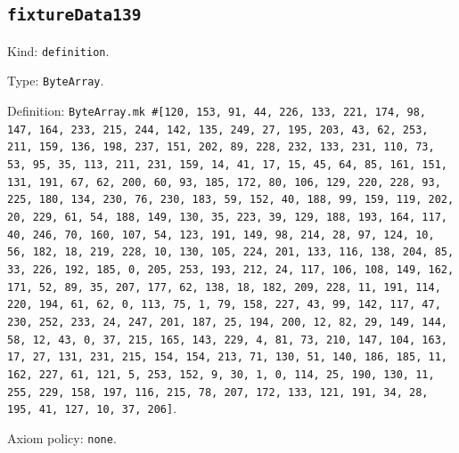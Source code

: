 \documentclass[11pt]{article}
\begin{document}
\subsection*{\texttt{fixtureData139}}
\noindent Kind: \texttt{definition}.\par
\noindent Type: \texttt{ByteArray}.\par
\noindent Definition: \texttt{ByteArray.mk \#[120, 153, 91, 44, 226, 133, 221, 174, 98, 147, 164, 233, 215, 244, 142, 135, 249, 27, 195, 203, 43, 62, 253, 211, 159, 136, 198, 237, 151, 202, 89, 228, 232, 133, 231, 110, 73, 53, 95, 35, 113, 211, 231, 159, 14, 41, 17, 15, 45, 64, 85, 161, 151, 131, 191, 67, 62, 200, 60, 93, 185, 172, 80, 106, 129, 220, 228, 93, 225, 180, 134, 230, 76, 230, 183, 59, 152, 40, 188, 99, 159, 119, 202, 20, 229, 61, 54, 188, 149, 130, 35, 223, 39, 129, 188, 193, 164, 117, 40, 246, 70, 160, 107, 54, 123, 191, 149, 98, 214, 28, 97, 124, 10, 56, 182, 18, 219, 228, 10, 130, 105, 224, 201, 133, 116, 138, 204, 85, 33, 226, 192, 185, 0, 205, 253, 193, 212, 24, 117, 106, 108, 149, 162, 171, 52, 89, 35, 207, 177, 62, 138, 18, 182, 209, 228, 11, 191, 114, 220, 194, 61, 62, 0, 113, 75, 1, 79, 158, 227, 43, 99, 142, 117, 47, 230, 252, 233, 24, 247, 201, 187, 25, 194, 200, 12, 82, 29, 149, 144, 58, 12, 43, 0, 37, 215, 165, 143, 229, 4, 81, 73, 210, 147, 104, 163, 17, 27, 131, 231, 215, 154, 154, 213, 71, 130, 51, 140, 186, 185, 11, 162, 227, 61, 121, 5, 253, 152, 9, 30, 1, 0, 114, 25, 190, 130, 11, 255, 229, 158, 197, 116, 215, 78, 207, 172, 133, 121, 191, 34, 28, 195, 41, 127, 10, 37, 206]}.\par
\noindent Axiom policy: \texttt{none}.\par
\end{document}
